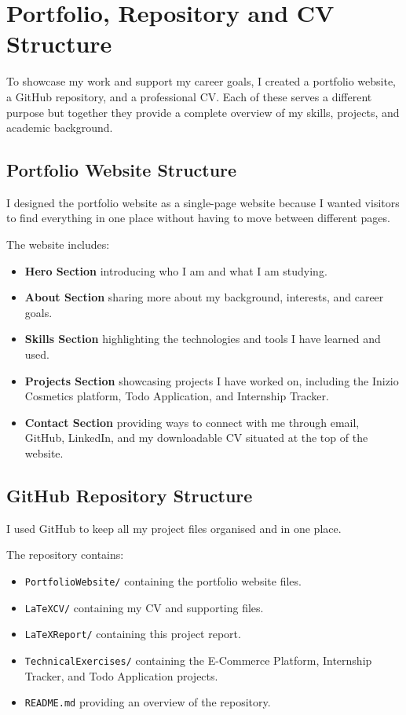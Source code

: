 \documentclass[12pt,a4paper]{article}
\begin{document}
\section{Portfolio, Repository and CV Structure}

To showcase my work and support my career goals, I created a portfolio website, a GitHub repository, and a professional CV. Each of these serves a different purpose but together they provide a complete overview of my skills, projects, and academic background.

\subsection{Portfolio Website Structure}

I designed the portfolio website as a single-page website because I wanted visitors to find everything in one place without having to move between different pages.

The website includes:

\begin{itemize}
\item \textbf{Hero Section} introducing who I am and what I am studying.
\item \textbf{About Section} sharing more about my background, interests, and career goals.
\item \textbf{Skills Section} highlighting the technologies and tools I have learned and used.
\item \textbf{Projects Section} showcasing projects I have worked on, including the Inizio Cosmetics platform, Todo Application, and Internship Tracker.
\item \textbf{Contact Section} providing ways to connect with me through email, GitHub, LinkedIn, and my downloadable CV situated at the top of the website.
\end{itemize}

\subsection{GitHub Repository Structure}

I used GitHub to keep all my project files organised and in one place.

The repository contains:

\begin{itemize}
\item \texttt{PortfolioWebsite/} containing the portfolio website files.
\item \texttt{LaTeXCV/} containing my CV and supporting files.
\item \texttt{LaTeXReport/} containing this project report.
\item \texttt{TechnicalExercises/} containing the E-Commerce Platform, Internship Tracker, and Todo Application projects.
\item \texttt{README.md} providing an overview of the repository.
\end{itemize}
\end{document}
